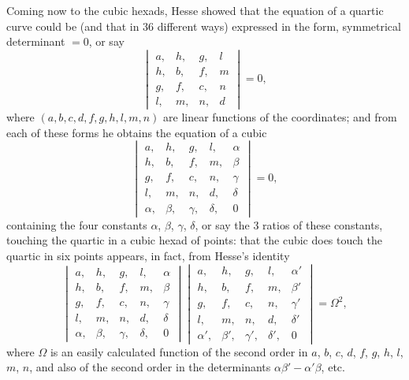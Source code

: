 \documentclass[11pt,a4paper]{article}
\begin{document}
\clearpage
Coming now to the cubic hexads, Hesse showed that the equation of a quartic curve could be (and that in 36 different ways) expressed in the form, symmetrical determinant $= 0$, or say
\[
\begin{vmatrix}
a, & h, & g, & l \\
h, & b, & f, & m \\
g, & f, & c, & n \\
l, & m, & n, & d
\end{vmatrix}
= 0,
\]
where $(a, b, c, d, f, g, h, l, m, n)$ are linear functions of the coordinates; and from each of these forms he obtains the equation of a cubic
\[
\begin{vmatrix}
a, & h, & g, & l, & \alpha \\
h, & b, & f, & m, & \beta \\
g, & f, & c, & n, & \gamma \\
l, & m, & n, & d, & \delta \\
\alpha, & \beta, & \gamma, & \delta, & 0
\end{vmatrix}
= 0,
\]
containing the four constants $\alpha$, $\beta$, $\gamma$, $\delta$, or say the 3 ratios of these constants, touching the quartic in a cubic hexad of points: that the cubic does touch the quartic in six points appears, in fact, from Hesse's identity
\[
\begin{vmatrix}
a, & h, & g, & l, & \alpha \\
h, & b, & f, & m, & \beta \\
g, & f, & c, & n, & \gamma \\
l, & m, & n, & d, & \delta \\
\alpha, & \beta, & \gamma, & \delta, & 0
\end{vmatrix}
\begin{vmatrix}
a, & h, & g, & l, & \alpha' \\
h, & b, & f, & m, & \beta' \\
g, & f, & c, & n, & \gamma' \\
l, & m, & n, & d, & \delta' \\
\alpha', & \beta', & \gamma', & \delta', & 0
\end{vmatrix}
= \Omega^2,
\]
where $\Omega$ is an easily calculated function of the second order in $a$, $b$, $c$, $d$, $f$, $g$, $h$, $l$, $m$, $n$, and also of the second order in the determinants $\alpha\beta' - \alpha'\beta$, etc.
\end{document}
